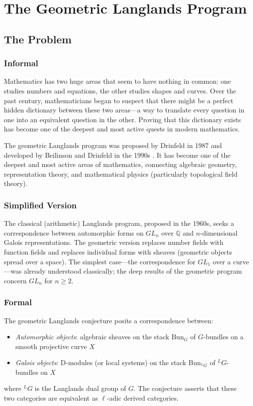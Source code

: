 \let\LocalMacro\relax

\chapter{The Geometric Langlands Program}

\section{The Problem}

\subsection{Informal}
Mathematics has two huge areas that seem to have nothing in common: one studies numbers and equations, the other studies shapes and curves. Over the past century, mathematicians began to suspect that there might be a perfect hidden dictionary between these two areas---a way to translate every question in one into an equivalent question in the other. Proving that this dictionary exists has become one of the deepest and most active quests in modern mathematics.

\begin{historicalbox}
The geometric Langlands program was proposed by Drinfeld in 1987 and developed by Beilinson and Drinfeld in the 1990s \cite{drinfeld1987, beilinson2004}. It has become one of the deepest and most active areas of mathematics, connecting algebraic geometry, representation theory, and mathematical physics (particularly topological field theory).
\end{historicalbox}

\subsection{Simplified Version}
The classical (arithmetic) Langlands program, proposed in the 1960s, seeks a correspondence between automorphic forms on $GL_n$ over $\mathbb{Q}$ and $n$-dimensional Galois representations. The geometric version replaces number fields with function fields and replaces individual forms with sheaves (geometric objects spread over a space). The simplest case---the correspondence for $GL_1$ over a curve---was already understood classically; the deep results of the geometric program concern $GL_n$ for $n \ge 2$.

\subsection{Formal}
The geometric Langlands conjecture posits a correspondence between:
\begin{itemize}
\item \emph{Automorphic objects}: algebraic sheaves on the stack $\mathrm{Bun}_G$ of $G$-bundles on a smooth projective curve $X$
\item \emph{Galois objects}: D-modules (or local systems) on the stack $\mathrm{Bun}_{^L G}$ of $^L G$-bundles on $X$
\end{itemize}
where $^L G$ is the Langlands dual group of $G$. The conjecture asserts that these two categories are equivalent as $\ell$-adic derived categories.

